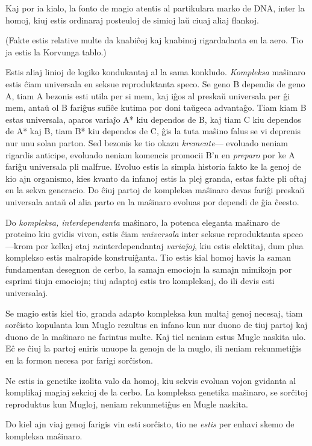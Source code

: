 Kaj por ia kialo, la fonto de magio atentis al partikulara marko de
DNA, inter la homoj, kiuj estis ordinaraj posteuloj de simioj laŭ ciuaj
aliaj flankoj.

(Fakte estis relative multe da knabiĉoj kaj knabinoj rigardadanta en
la aero. Tio ja estis la Korvunga tablo.)

Estis aliaj linioj de logiko kondukantaj al la sama
konkludo. \emph{Kompleksa} maŝinaro estis ĉiam universala en seksue
reproduktanta speco. Se geno B dependis de geno A, tiam A bezonis esti
utila per si mem, kaj iĝos al preskaŭ universala per ĝi mem, antaŭ ol
B fariĝus sufiĉe kutima por doni taŭgeca advantaĝo. Tiam kiam B estas
universala, aparos variaĵo A* kiu dependos de B, kaj tiam C kiu
dependos de A* kaj B, tiam B* kiu dependos de C, ĝis la tuta maŝino
falus se vi deprenis nur unu solan parton. Sed bezonis ke tio okazu
\emph{kremente}— evoluado neniam rigardis anticipe, evoluado neniam
komencis promocii B'n en \emph{preparo} por ke A fariĝu universala pli
malfrue. Evoluo estis la simpla historia fakto ke la genoj de kio ajn
organismo, kies kvanto da infanoj estis la plej granda, estas fakte
pli oftaj en la sekva generacio. Do ĉiuj partoj de kompleksa maŝinaro
devas fariĝi preskaŭ universala antaŭ ol alia parto en la maŝinaro
evoluas por dependi de ĝia ĉeesto.

Do \emph{kompleksa, interdependanta} maŝinaro, la potenca eleganta
maŝinaro de proteino kiu gvidis vivon, estis ĉiam \emph{universala}
inter seksue reproduktanta speco—krom por kelkaj etaj
\emph{ne}interdependantaj \emph{variaĵoj}, kiu estis elektitaj, dum
plua komplekso estis malrapide konstruiĝanta. Tio estis kial homoj
havis la saman fundamentan desegnon de cerbo, la samajn emociojn la
samajn mimikojn por esprimi tiujn emociojn; tiuj adaptoj estis tro
kompleksaj, do ili devis esti universalaj.

Se magio estis kiel tio, granda adapto kompleksa kun multaj genoj
necesaj, tiam sorĉisto kopulanta kun Muglo rezultus en infano kun nur
duono de tiuj partoj kaj duono de la maŝinaro ne farintus multe. Kaj
tiel neniam estus Mugle naskita ulo. Eĉ se ĉiuj la partoj eniris
unuope la genojn de la muglo, ili neniam rekunmetiĝis en la formon
necesa por farigi sorĉiston.

Ne estis ia genetike izolita valo da homoj, kiu sekvis evoluan vojon
gvidanta al komplikaj magiaj sekcioj de la cerbo. La kompleksa
genetika maŝinaro, se sorĉitoj reproduktus kun Mugloj, neniam
rekunmetiĝus en Mugle naskita.

Do kiel ajn viaj genoj farigis vin esti sorĉisto, tio ne \emph{estis}
per enhavi skemo de kompleksa maŝinaro.


